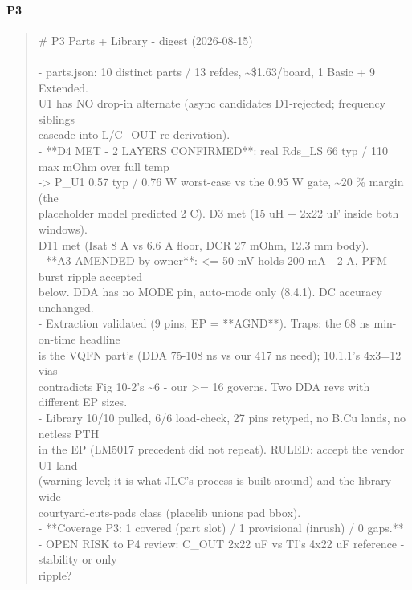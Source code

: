 \documentclass[11pt,a4paper]{article}
\begin{document}
\paragraph*{P3}
\begin{quote}\small\ttfamily\raggedright
\# P3 Parts + Library - digest (2026-08-15)\\
~\\
- parts.json: 10 distinct parts / 13 refdes, \textasciitilde{}\$1.63/board, 1 Basic + 9 Extended.\\
  U1 has NO drop-in alternate (async candidates D1-rejected; frequency siblings\\
  cascade into L/C\_OUT re-derivation).\\
- {*}{*}D4 MET - 2 LAYERS CONFIRMED{*}{*}: real Rds\_LS 66 typ / 110 max mOhm over full temp\\
  -\textgreater{} P\_U1 0.57 typ / 0.76 W worst-case vs the 0.95 W gate, \textasciitilde{}20 \% margin (the\\
  placeholder model predicted 2 C). D3 met (15 uH + 2x22 uF inside both windows).\\
  D11 met (Isat 8 A vs 6.6 A floor, DCR 27 mOhm, 12.3 mm body).\\
- {*}{*}A3 AMENDED by owner{*}{*}: \textless{}= 50 mV holds 200 mA - 2 A, PFM burst ripple accepted\\
  below. DDA has no MODE pin, auto-mode only (8.4.1). DC accuracy unchanged.\\
- Extraction validated (9 pins, EP = {*}{*}AGND{*}{*}). Traps: the 68 ns min-on-time headline\\
  is the VQFN part's (DDA 75-108 ns vs our 417 ns need); 10.1.1's 4x3=12 vias\\
  contradicts Fig 10-2's \textasciitilde{}6 - our \textgreater{}= 16 governs. Two DDA revs with different EP sizes.\\
- Library 10/10 pulled, 6/6 load-check, 27 pins retyped, no B.Cu lands, no netless PTH\\
  in the EP (LM5017 precedent did not repeat). RULED: accept the vendor U1 land\\
  (warning-level; it is what JLC's process is built around) and the library-wide\\
  courtyard-cuts-pads class (placelib unions pad bbox).\\
- {*}{*}Coverage P3: 1 covered (part slot) / 1 provisional (inrush) / 0 gaps.{*}{*}\\
- OPEN RISK to P4 review: C\_OUT 2x22 uF vs TI's 4x22 uF reference - stability or only\\
  ripple?
\end{quote}
\end{document}
